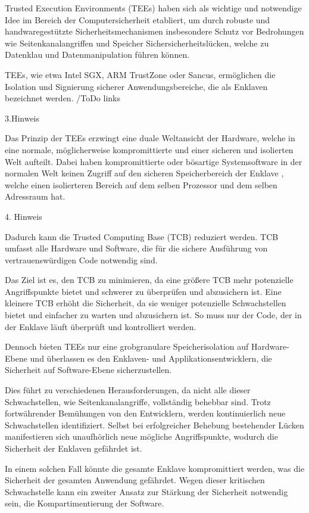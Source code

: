 Trusted Execution Environments (TEEs) haben sich als wichtige und notwendige Idee im Bereich der Computersicherheit etabliert, um durch robuste und handwaregestützte Sicherheitsmechanismen insbesondere Schutz vor Bedrohungen wie Seitenkanalangriffen und Speicher Sichersicherheitslücken, welche zu Datenklau und Datenmanipulation führen können.

TEEs, wie etwa Intel SGX, ARM TrustZone oder Sancus, ermöglichen die Isolation und Signierung sicherer Anwendungsbereiche, die als Enklaven bezeichnet werden. /ToDo links

3.Hinweis

Das Prinzip der TEEs erzwingt eine duale Weltansicht der Hardware, welche in eine normale, möglicherweise kompromittierte und einer sicheren und isolierten Welt aufteilt. Dabei haben kompromittierte oder bösartige Systemsoftware in der normalen Welt keinen Zugriff auf den sicheren Speicherbereich der Enklave , welche einen isolierteren Bereich auf dem selben Prozessor und dem selben Adressraum hat. 

4. Hinweis

Dadurch kann die Trusted Computing Base (TCB) reduziert werden. TCB umfasst alle Hardware und Software, die für die sichere Ausführung von vertrauenswürdigen Code notwendig sind. 

Das Ziel ist es, den TCB zu minimieren, da eine größere TCB mehr potenzielle Angriffspunkte bietet und schwerer zu überprüfen und abzusichern ist. Eine kleinere TCB erhöht die Sicherheit, da sie weniger potenzielle Schwachstellen bietet und einfacher zu warten und abzusichern ist. So muss nur der Code, der in der Enklave läuft überprüft und kontrolliert werden.

Dennoch bieten TEEs nur eine grobgranulare Speicherisolation auf Hardware-Ebene und überlassen es den Enklaven- und Applikationsentwicklern, die Sicherheit auf Software-Ebene sicherzustellen. 

Dies führt zu verschiedenen Herausforderungen, da nicht alle dieser Schwachstellen, wie Seitenkanalangriffe, vollständig behebbar sind. Trotz fortwährender Bemühungen von den Entwicklern, werden kontinuierlich neue Schwachstellen identifiziert. Selbst bei erfolgreicher Behebung bestehender Lücken manifestieren sich unaufhörlich neue mögliche  Angriffspunkte, wodurch die Sicherheit der Enklaven gefährdet ist.

In einem solchen Fall könnte die gesamte Enklave kompromittiert werden, was die Sicherheit der gesamten Anwendung gefährdet. Wegen dieser kritischen Schwachstelle kann ein zweiter Ansatz zur Stärkung der Sicherheit notwendig sein, die Kompartimentierung der Software.

